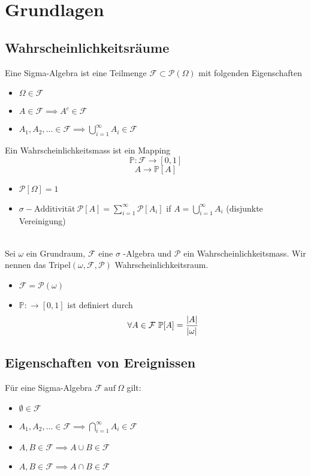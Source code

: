 \section{Grundlagen}
\subsection[]{Wahrscheinlichkeitsräume}
 \newline
Eine Sigma-Algebra ist eine Teilmenge \(\mathcal{F} \subset \mathcal{P}(\Omega)\) mit folgenden Eigenschaften
\begin{itemize}
    \item \(\Omega \in \mathcal{F}\)
    \item  \(A \in \mathcal{F} \implies A^c \in \mathcal{F}\)
    \item \(A_1, A_2, \dots \in \mathcal{F} \implies \bigcup_{i=1}^{\infty} A_i \in \mathcal{F} \)
\end{itemize}
\Def[1.2 Wahrscheinlichkeitsmass ] \newline
Ein Wahrscheinlichkeitsmass ist ein Mapping 
\[ \mathbb{P}: \mathcal{F} \rightarrow [0,1]\]
\[ A \rightarrow \mathbb{P}[A]\]
\begin{itemize}
    \item \( \mathcal{P}[\Omega] = 1\)
    \item \(\sigma-\text{Additivität} \ \mathcal{P}[A] = \sum_{i=1}^{\infty} \mathcal{P}[A_i]\) \newline if \( A = \bigcup_{i=1}^{\infty} A_i \) (disjunkte Vereinigung)
\end{itemize}
\Def[1.3 Wahrscheinlichkeitsraum ] \\
Sei \( \omega \) ein Grundraum, \(\mathcal{F}\) eine \(\sigma\) -Algebra und \(\mathcal{P}\) ein Wahrscheinlichkeitsmass. Wir nennen das Tripel\( (\omega, \mathcal{F}, \mathcal{P})\)  Wahrscheinlichkeitsraum.
 \\
\begin{itemize}
    \item \(\mathcal{F} = \mathcal{P}(\omega)\)
    \item \(\mathbb{P} : \rightarrow \left[0,1\right]\) ist definiert durch \[ \forall A \in \mathcal{F} \ \mathbb{P}[A] = \frac{\left\lvert A \right\rvert}{\left\lvert \omega \right\rvert}\]
\end{itemize}
\subsection{Eigenschaften von Ereignissen}
\Satz[1.6]
Für eine Sigma-Algebra \(\mathcal{F} \ \text{auf} \ \Omega\) gilt:
\begin{itemize}
    \item \(\emptyset \in \mathcal{F}\)
    \item \(A_1, A_2, \dots \in \mathcal{F} \implies \bigcap_{i=1}^{\infty} A_i \in \mathcal{F}\)
    \item \(A,B \in \mathcal{F} \implies A \cup B \in \mathcal{F}\)
    \item \(A,B \in \mathcal{F} \implies A \cap B \in \mathcal{F}\)
\end{itemize}
